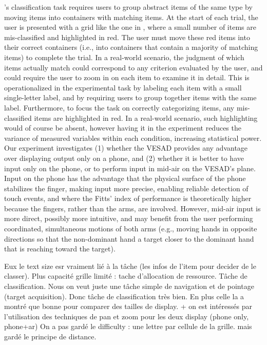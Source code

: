 
\citeauthor{Liu2014}'s classification task requires users to group abstract items of the same type by moving items into containers with matching items. At the start of each trial, the user is presented with a grid like the one in , where a small number of items are mis-classified and highlighted in red. The user must move these red items into their correct containers (i.e., into containers that contain a majority of matching items) to complete the trial. In a real-world scenario, the judgment of which items actually match could correspond to any criterion evaluated by the user, and could require the user to zoom in on each item to examine it in detail. This is operationalized in the experimental task by labeling each item with a small single-letter label, and by requiring users to group together items with the same label. Furthermore, to focus the task on correctly categorizing items, any mis-classified items are highlighted in red. In a real-world scenario, such highlighting would of course be absent, however having it in the experiment reduces the variance of measured variables within each condition, increasing statistical power. Our experiment investigates (1) whether the VESAD provides any advantage over displaying output only on a phone, and (2) whether it is better to have input only on the phone, or to perform input in mid-air on the VESAD's plane. Input on the phone has the advantage that the physical surface of the phone stabilizes the finger, making input more precise, enabling reliable detection of touch events, and where the Fitts' index of performance is theoretically higher because the fingers, rather than the arms, are involved. However, mid-air input is more direct, possibly more intuitive, and may benefit from the user performing coordinated, simultaneous motions of both arms (e.g., moving hands in opposite directions so that the non-dominant hand  a target closer to the dominant hand that is reaching toward the target).

Eux le text size esr vraiment lié à la tâche (les infos de l'item pour decider de le classer). Plus capacité grille limité : tache d'allocation de ressource. Tâche de classification.
Nous on veut juste une tâche simple de navigation et de pointage (target acquisition). Donc tâche de classification très bien. En plus celle la a montré que bonne pour comparer des tailles de display. + on est intéressés par l'utilisation des techniques de pan et zoom pour les deux display (phone only, phone+ar)
On a pas gardé le difficulty : une lettre par cellule de la grille. mais gardé le principe de distance.

